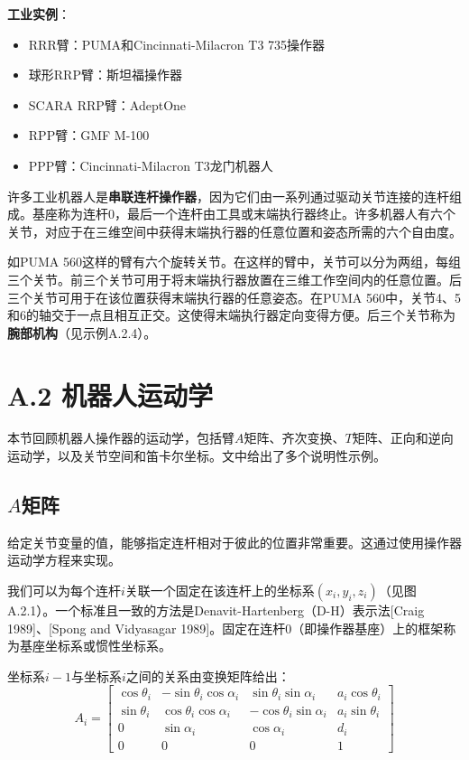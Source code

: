 \documentclass[UTF8,a4paper]{ctexart}
\begin{document}
\textbf{工业实例}：
\begin{itemize}
    \item RRR臂：PUMA和Cincinnati-Milacron T3 735操作器
    \item 球形RRP臂：斯坦福操作器
    \item SCARA RRP臂：AdeptOne
    \item RPP臂：GMF M-100
    \item PPP臂：Cincinnati-Milacron T3龙门机器人
\end{itemize}

许多工业机器人是\textbf{串联连杆操作器}，因为它们由一系列通过驱动关节连接的连杆组成。基座称为连杆0，最后一个连杆由工具或末端执行器终止。许多机器人有六个关节，对应于在三维空间中获得末端执行器的任意位置和姿态所需的六个自由度。

如PUMA 560这样的臂有六个旋转关节。在这样的臂中，关节可以分为两组，每组三个关节。前三个关节可用于将末端执行器放置在三维工作空间内的任意位置。后三个关节可用于在该位置获得末端执行器的任意姿态。在PUMA 560中，关节4、5和6的轴交于一点且相互正交。这使得末端执行器定向变得方便。后三个关节称为\textbf{腕部机构}（见示例A.2.4）。

\section{A.2 机器人运动学}

本节回顾机器人操作器的运动学，包括臂$A$矩阵、齐次变换、$T$矩阵、正向和逆向运动学，以及关节空间和笛卡尔坐标。文中给出了多个说明性示例。

\subsection{$A$矩阵}

给定关节变量的值，能够指定连杆相对于彼此的位置非常重要。这通过使用操作器运动学方程来实现。

我们可以为每个连杆$i$关联一个固定在该连杆上的坐标系$(x_i, y_i, z_i)$（见图A.2.1）。一个标准且一致的方法是Denavit-Hartenberg（D-H）表示法[Craig 1989]、[Spong and Vidyasagar 1989]。固定在连杆0（即操作器基座）上的框架称为基座坐标系或惯性坐标系。

坐标系$i-1$与坐标系$i$之间的关系由变换矩阵给出：
\begin{equation}
A_i = \begin{bmatrix}
\cos\theta_i & -\sin\theta_i\cos\alpha_i & \sin\theta_i\sin\alpha_i & a_i\cos\theta_i \\
\sin\theta_i & \cos\theta_i\cos\alpha_i & -\cos\theta_i\sin\alpha_i & a_i\sin\theta_i \\
0 & \sin\alpha_i & \cos\alpha_i & d_i \\
0 & 0 & 0 & 1
\end{bmatrix}
\tag{A.2.1}
\end{equation}
\end{document}
